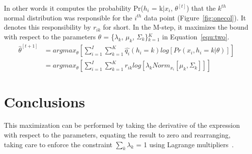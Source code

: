 \documentclass[10pt,twocolumn,letterpaper]{article}
\begin{document}
In other words it computes the probability Pr($h_i$ = k$|$$x_i$, $\theta^{[t]}$) that the $k^{th}$ normal distribution was responsible for the $i^{th}$ data point (Figure~\ref{fig:onecol}). It denotes this responsibility by $r_{ik}$ for short. In the M-step, it maximizes the bound with respect to the parameters $\theta$ = \{$\lambda_k$, $\mu_k$, $\Sigma_k$\}$^K_{k=1}$ in  Equation~\ref{equ:two}.
\begin{equation}
\begin{split}
\hat{\theta}^{[t+1]} & = argmax_{\theta}[\sum_{i = 1}^I\sum_{k = 1}^K\hat{q_i}(h_i = k)log[Pr(x_i, h_i = k|\theta)]] \\
& = argmax_{\theta}[\sum_{i = 1}^I\sum_{k = 1}^Kr_{ik}log[\lambda_kNorm_{x_i}[\mu_k, \Sigma_k]]]
\end{split}
\label{equ:two}
\end{equation}


\section{Conclusions}
This maximization can be performed by taking the derivative of the expression with respect to the parameters, equating the result to zero and rearranging, taking care to enforce the constraint $\sum_k$$\lambda_k$ = 1 using Lagrange multipliers~\cite{Belgacem1999The}.


{\small


}
\end{document}
